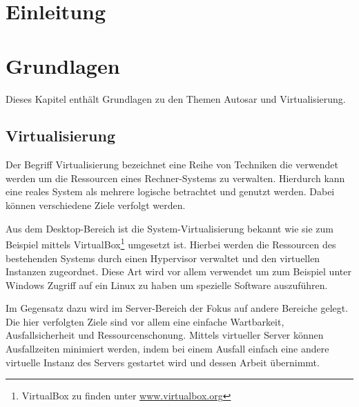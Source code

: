 \documentclass[
  a4paper,					    %
  twoside,
  DIV=calc,     				%
  bibliography=totoc,
  cleardoublepage=empty,
  ngerman,     					%
  final       					%
]{scrbook}
\begin{document}









\mainmatter
\chapter{Einleitung}
\label{sec:Einleitung}







\chapter{Grundlagen}
\label{sec:Grundlagen}
Dieses Kapitel enthält Grundlagen zu den Themen Autosar und Virtualisierung.


\section{Virtualisierung}
\label{sec:Virtualisierung}
Der Begriff Virtualisierung bezeichnet eine Reihe von Techniken die verwendet werden um die Ressourcen eines Rechner-Systems zu verwalten. Hierdurch kann eine reales System als mehrere logische betrachtet und genutzt werden. Dabei können verschiedene Ziele verfolgt werden.

Aus dem Desktop-Bereich ist die System-Virtualisierung bekannt wie sie zum Beispiel mittels VirtualBox\footnote{VirtualBox zu finden unter \url{www.virtualbox.org}} umgesetzt ist. Hierbei werden die Ressourcen des bestehenden Systems durch einen Hypervisor verwaltet und den virtuellen Instanzen zugeordnet. Diese Art wird vor allem verwendet um zum Beispiel unter Windows Zugriff auf ein Linux zu haben um spezielle Software auszuführen.

Im Gegensatz dazu wird im Server-Bereich der Fokus auf andere Bereiche gelegt. Die hier verfolgten Ziele sind vor allem eine einfache Wartbarkeit, Ausfallsicherheit und Ressourcenschonung. Mittels virtueller Server können Ausfallzeiten minimiert werden, indem bei einem Ausfall einfach eine andere virtuelle Instanz des Servers gestartet wird und dessen Arbeit übernimmt. 
\end{document}

